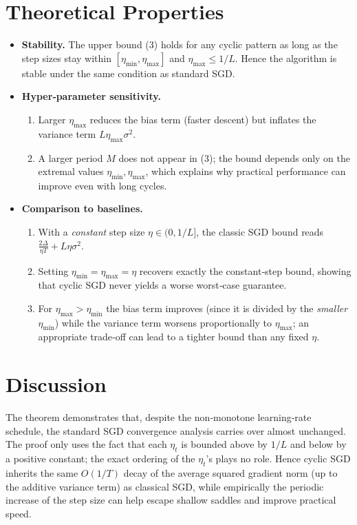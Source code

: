 \documentclass{article}
\begin{document}
\section*{Theoretical Properties}
\begin{itemize}[leftmargin=*]
\item \textbf{Stability.} The upper bound (3) holds for any cyclic pattern as long as the step sizes stay within $[\eta_{\min},\eta_{\max}]$ and $\eta_{\max}\le 1/L$. Hence the algorithm is stable under the same condition as standard SGD.
\item \textbf{Hyper‑parameter sensitivity.}
    \begin{enumerate}
        \item Larger $\eta_{\max}$ reduces the bias term (faster descent) but inflates the variance term $L\eta_{\max}\sigma^{2}$.
        \item A larger period $M$ does not appear in (3); the bound depends only on the extremal values $\eta_{\min},\eta_{\max}$, which explains why practical performance can improve even with long cycles.
    \end{enumerate}
\item \textbf{Comparison to baselines.}
    \begin{enumerate}
        \item With a \emph{constant} step size $\eta\in(0,1/L]$, the classic SGD bound reads
        $\frac{2\Delta}{\eta T}+L\eta\sigma^{2}$.
        \item Setting $\eta_{\min}=\eta_{\max}=\eta$ recovers exactly the constant‑step bound, showing that cyclic SGD never yields a worse worst‑case guarantee.
        \item For $\eta_{\max}> \eta_{\min}$ the bias term improves (since it is divided by the \emph{smaller} $\eta_{\min}$) while the variance term worsens proportionally to $\eta_{\max}$; an appropriate trade‑off can lead to a tighter bound than any fixed $\eta$.
    \end{enumerate}
\end{itemize}

\section*{Discussion}
The theorem demonstrates that, despite the non‑monotone learning‑rate schedule, the standard SGD convergence analysis carries over almost unchanged. The proof only uses the fact that each $\eta_t$ is bounded above by $1/L$ and below by a positive constant; the exact ordering of the $\eta_t$’s plays no role. Hence cyclic SGD inherits the same $O(1/T)$ decay of the average squared gradient norm (up to the additive variance term) as classical SGD, while empirically the periodic increase of the step size can help escape shallow saddles and improve practical speed.
\end{document}
